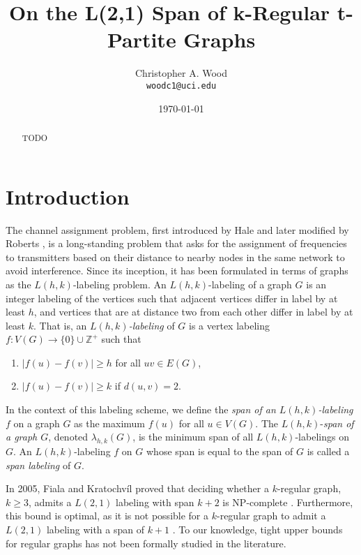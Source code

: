 \documentclass[12pt]{article}
\title{On the L(2,1) Span of k-Regular t-Partite Graphs}
\author{
        Christopher A. Wood \\
        {\tt woodc1@uci.edu} \\
}
\date{\today}
\begin{document}
\maketitle

\begin{abstract}
TODO
\end{abstract}


\section{Introduction} \label{sec:introduction}
The channel assignment problem, first introduced by Hale and later modified by Roberts \cite{Calamonery-LhkSurvey}, is a long-standing problem that asks for the assignment of frequencies to transmitters based on their distance to nearby nodes in the same network to avoid interference. Since its inception, it has been formulated in terms of graphs as the $L(h,k)$-labeling problem. An $L(h,k)$-labeling of a graph $G$ is an integer labeling of the vertices such that adjacent vertices differ in label by at least $h$, and vertices that are at distance two from each other differ in label by at least $k$. That is, an \emph{$L(h,k)$-labeling} of $G$ is a vertex labeling $f : V(G) \to \{0\} \cup \mathbb{Z}^+$ such that 
\begin{enumerate}
  \item $|f(u) - f(v)| \geq h$ for all $uv \in E(G)$,
  \item $|f(u) - f(v)| \geq k$ if $d(u,v) = 2$.
\end{enumerate}

In the context of this labeling scheme, we define the \emph{span of an $L(h,k)$-labeling $f$} on a graph $G$ as the maximum $f(u)$ for all $u \in V(G)$. The $L(h,k)$-\emph{span of a graph $G$}, denoted $\lambda_{h,k}(G)$, is the minimum span of all $L(h,k)$-labelings on $G$. An $L(h,k)$-labeling $f$ on $G$ whose span is equal to the span of $G$ is called a \emph{span labeling} of $G$.

In 2005, Fiala and Kratochvíl proved that deciding whether a $k$-regular graph, $k \geq 3$, admits a $L(2,1)$ labeling with span $k + 2$ is NP-complete \cite{Coppo05-1}. Furthermore, this bound is optimal, as it is not possible for a $k$-regular graph to admit a $L(2,1)$ labeling with a span of $k + 1$ \cite{Georges03-1, Calamonery-LhkSurvey}. To our knowledge, tight upper bounds for regular graphs has not been formally studied in the literature. 
\end{document}
